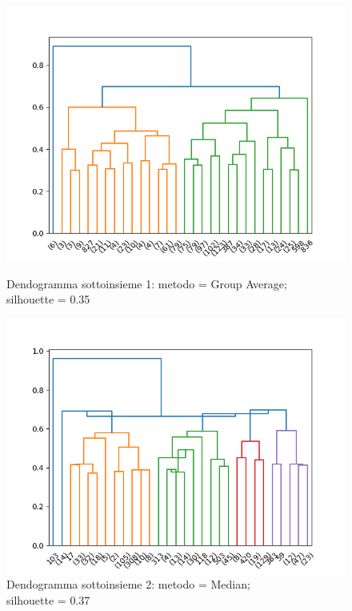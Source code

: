 \documentclass[a4paper,9pt]{article}
\begin{document}
\begin{figure}[H]
  \centering
  \begin{minipage}{.45\textwidth}
    \centering
    \includegraphics[width=\textwidth]{DistanceFromHome,Age,MonthlyIncome035Average.png}
    \caption{Dendogramma sottoinsieme 1:  metodo = Group Average;\\ silhouette = 0.35}
  \end{minipage}
  \begin{minipage}{.45\textwidth}
    \centering
    \includegraphics[width=\textwidth]{hierarchical_df3.png}
    \caption{Dendogramma sottoinsieme 2:  metodo = Median;\\ silhouette = 0.37}
  \end{minipage}
  \end{figure}
\end{document}
